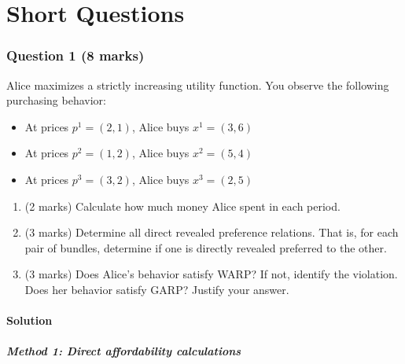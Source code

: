 \documentclass[12pt]{article}
\begin{document}

\newpage

\part{Short Questions}
\section*{Question 1 (8 marks)}

Alice maximizes a strictly increasing utility function. You observe the following purchasing behavior:
\begin{itemize}
\item At prices $p^1 = (2, 1)$, Alice buys $x^1 = (3, 6)$
\item At prices $p^2 = (1, 2)$, Alice buys $x^2 = (5, 4)$
\item At prices $p^3 = (3, 2)$, Alice buys $x^3 = (2, 5)$
\end{itemize}

\begin{enumerate}[label=(\alph*)]
\item (2 marks) Calculate how much money Alice spent in each period.
\item (3 marks) Determine all direct revealed preference relations. That is, for each pair of bundles, determine if one is directly revealed preferred to the other.
\item (3 marks) Does Alice's behavior satisfy WARP? If not, identify the violation. Does her behavior satisfy GARP? Justify your answer.
\end{enumerate}

\subsection*{Solution}

\subsubsection*{Method 1: Direct affordability calculations}
\end{document}
